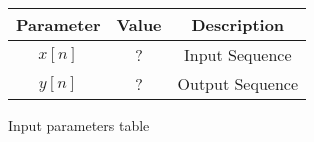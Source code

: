 \centering
\begin{tabular}{|c|c|c|}
        \hline
        \textbf{Parameter} & \textbf{Value} & \textbf{Description} \\
        \hline
        $x[n]$ & ? & Input Sequence \\
        \hline
        $y[n]$ & ? & Output Sequence \\
        \hline
        
\end{tabular}
\caption{Input parameters table}
\label{tab:GATE.2023.BM.26.1}




